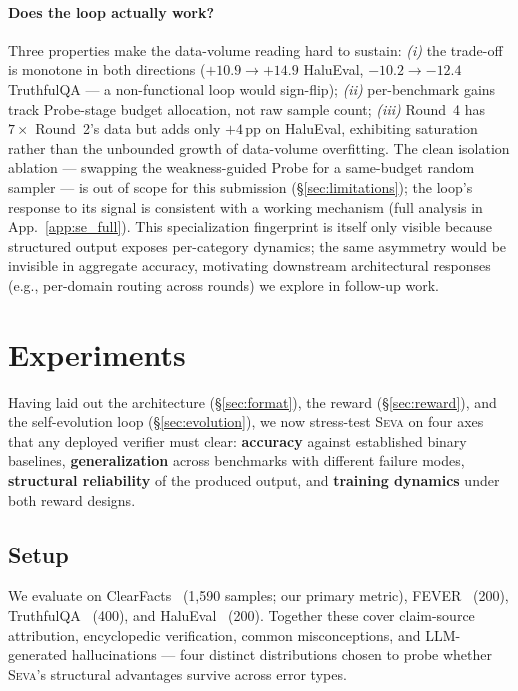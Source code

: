 \documentclass{article}
\newcommand{\seva}{\textsc{Seva}\xspace}
\begin{document}
\paragraph{Does the loop actually work?}
Three properties make the data-volume reading hard to sustain: \emph{(i)} the trade-off is monotone in both directions ($+10.9{\to}+14.9$ HaluEval, $-10.2{\to}-12.4$ TruthfulQA --- a non-functional loop would sign-flip); \emph{(ii)} per-benchmark gains track Probe-stage budget allocation, not raw sample count; \emph{(iii)} Round~4 has $7\times$ Round~2's data but adds only $+4$\,pp on HaluEval, exhibiting saturation rather than the unbounded growth of data-volume overfitting.
The clean isolation ablation --- swapping the weakness-guided Probe for a same-budget random sampler --- is out of scope for this submission (\S\ref{sec:limitations}); the loop's response to its signal is consistent with a working mechanism (full analysis in App.~\ref{app:se_full}).
This specialization fingerprint is itself only visible because structured output exposes per-category dynamics; the same asymmetry would be invisible in aggregate accuracy, motivating downstream architectural responses (e.g., per-domain routing across rounds) we explore in follow-up work.


\section{Experiments}
\label{sec:experiments}

Having laid out the architecture (\S\ref{sec:format}), the reward (\S\ref{sec:reward}), and the self-evolution loop (\S\ref{sec:evolution}), we now stress-test \seva on four axes that any deployed verifier must clear: \textbf{accuracy} against established binary baselines, \textbf{generalization} across benchmarks with different failure modes, \textbf{structural reliability} of the produced output, and \textbf{training dynamics} under both reward designs.

\subsection{Setup}

We evaluate on ClearFacts~\citep{seo2025vtv} (1,590 samples; our primary metric), FEVER~\citep{thorne2018fever} (200), TruthfulQA~\citep{lin2022truthfulqa} (400), and HaluEval~\citep{li2023halueval} (200).
Together these cover claim-source attribution, encyclopedic verification, common misconceptions, and LLM-generated hallucinations --- four distinct distributions chosen to probe whether \seva's structural advantages survive across error types.
\end{document}
